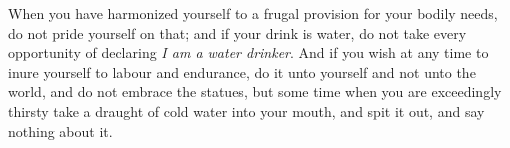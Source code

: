 When you have harmonized yourself to  a frugal provision for your bodily needs,
do not pride  yourself on that; and if  your drink is water, do  not take every
opportunity of declaring  \emph{I am a water  drinker}. And if you  wish at any
time to  inure yourself to  labour and endurance, do  it unto yourself  and not
unto the  world, and do  not embrace  the statues, but  some time when  you are
exceedingly thirsty take a  draught of cold water into your  mouth, and spit it
out, and say nothing about it.
